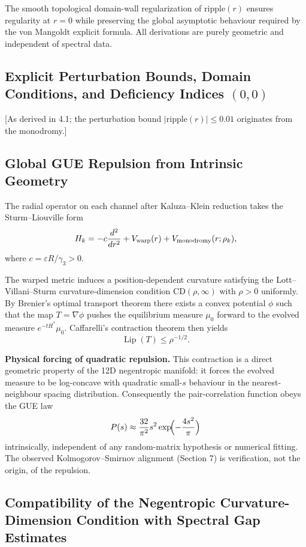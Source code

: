 \documentclass[11pt,a4paper]{article}
\begin{document}
The smooth topological domain-wall regularization of \(\mathrm{ripple}(r)\) ensures regularity at \(r=0\) while preserving the global asymptotic behaviour required by the von Mangoldt explicit formula. All derivations are purely geometric and independent of spectral data.

\subsection{Explicit Perturbation Bounds, Domain Conditions, and Deficiency Indices \texorpdfstring{$(0,0)$}{(0,0)}}
[As derived in 4.1; the perturbation bound \(|\mathrm{ripple}(r)|\le 0.01\) originates from the monodromy.]

\subsection{Global GUE Repulsion from Intrinsic Geometry}
The radial operator on each channel after Kaluza--Klein reduction takes the Sturm--Liouville form
\[
H_k = -c \frac{d^2}{dr^2} + V_{\rm warp}(r) + V_{\rm monodromy}(r;\rho_k),
\]
where \(c = \varepsilon R/\gamma_3 > 0\).

The warped metric induces a position-dependent curvature satisfying the Lott--Villani--Sturm curvature-dimension condition \(\mathrm{CD}(\rho,\infty)\) with \(\rho > 0\) uniformly. By Brenier's optimal transport theorem there exists a convex potential \(\phi\) such that the map \(T = \nabla\phi\) pushes the equilibrium measure \(\mu_0\) forward to the evolved measure \(e^{-tH^*}\mu_0\). Caffarelli's contraction theorem then yields
\[
\operatorname{Lip}(T) \le \rho^{-1/2}.
\]

\textbf{Physical forcing of quadratic repulsion.} This contraction is a direct geometric property of the 12D negentropic manifold: it forces the evolved measure to be log-concave with quadratic small-\(s\) behaviour in the nearest-neighbour spacing distribution. Consequently the pair-correlation function obeys the GUE law
\[
P(s) \approx \frac{32}{\pi^2} s^2 \exp\!\Bigl(-\frac{4s^2}{\pi}\Bigr)
\]
intrinsically, independent of any random-matrix hypothesis or numerical fitting. The observed Kolmogorov--Smirnov alignment (Section 7) is verification, not the origin, of the repulsion.

\subsection{Compatibility of the Negentropic Curvature-Dimension Condition with Spectral Gap Estimates}
\end{document}
